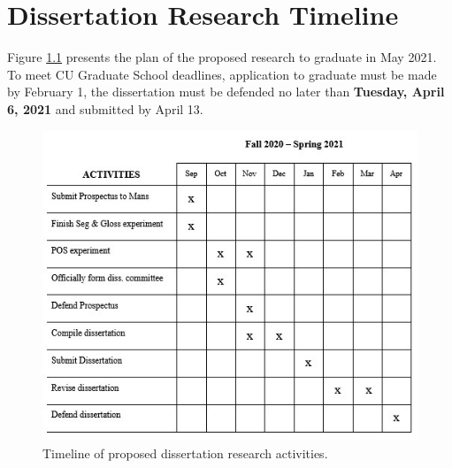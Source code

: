 \chapter{Dissertation Research Timeline}
\label{chap:timeline}

Figure \ref{fig:timeline} presents the plan of the proposed research to graduate in May 2021. To meet CU Graduate School deadlines, application to graduate must be made by February 1, the dissertation must be defended no later than \textbf{Tuesday, April 6, 2021} and submitted by April 13.


\begin{figure}[H]
    \centering
    \includegraphics[width=14cm]{figs/TimelineUpdated.jpg}
    \caption[Timeline]{Timeline of proposed dissertation research activities.}
    \label{fig:timeline}
\end{figure}